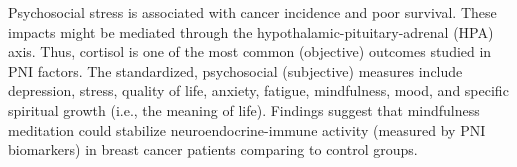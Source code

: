 \documentclass[12pt, a4paper]{article}
\begin{document}
Psychosocial stress is associated with cancer incidence and poor survival\cite{Chida2008}.
These impacts might be mediated through the hypothalamic-pituitary-adrenal (HPA) axis\cite{Hsiao2012}.
Thus, cortisol is one of the most common (objective) outcomes studied in PNI factors. %
The standardized, psychosocial (subjective) measures include depression, stress, quality of life, anxiety, fatigue, mindfulness, mood, and specific spiritual growth (i.e., the meaning of life)\cite{Hsiao2012}. %
Findings suggest that mindfulness meditation could stabilize neuroendocrine-immune activity (measured by PNI biomarkers) in breast cancer patients comparing to control groups\cite{Hulett2016}.
\end{document}
